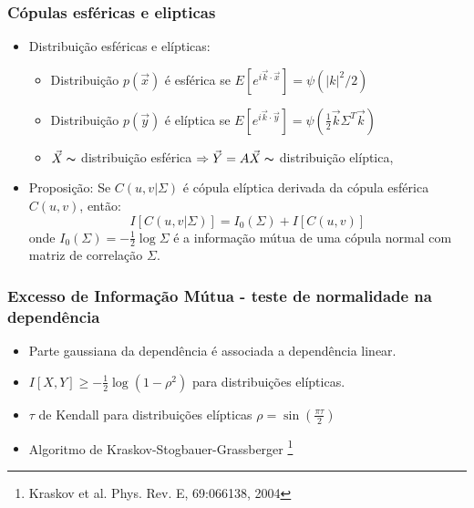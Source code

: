 \documentclass[ignorenonframetext,]{beamer}
\begin{document}
\begin{frame}\frametitle{Cópulas esféricas e elipticas}

\begin{itemize}
\itemsep1pt\parskip0pt
\item
  Distribuição esféricas e elípticas:

  \begin{itemize}
  \itemsep1pt\parskip0pt
  \item
    Distribuição $p(\vec{x})$ é esférica se
    $E\left[ e^{i\vec{k}\cdot\vec{x}}\right] = \psi\left(\vert k\vert ^2/2\right)$
  \item
    Distribuição $p(\vec{y})$ é elíptica se
    $E\left[ e^{i\vec{k}\cdot\vec{y}}\right] = \psi\left(\frac{1}{2}\vec{k}\Sigma^T \vec{k}\right)$
  \item
    $\vec{X} \thicksim$ distribuição esférica
    $\Rightarrow \vec{Y} = A\vec{X} \thicksim$ distribuição elíptica,
  \end{itemize}
\item
  Proposição: Se $C(u,v \vert  \Sigma)$ é cópula elíptica derivada da
  cópula esférica $C(u,v)$, então:
  \[I[C(u,v\vert \Sigma)] = I_{0}(\Sigma) + I[C(u,v)]\] onde
  $I_{0}(\Sigma) = -\frac{1}{2}\log\Sigma$ é a informação mútua de uma
  cópula normal com matriz de correlação $\Sigma$.
\end{itemize}

\end{frame}

\begin{frame}\frametitle{Excesso de Informação Mútua - teste de
normalidade na dependência}

\begin{itemize}
\itemsep1pt\parskip0pt
\item
  Parte gaussiana da dependência é associada a dependência linear.
\item
  $I[X,Y] \ge -\frac{1}{2}\log(1 - \rho^2)$ para distribuições
  elípticas.
\item
  $\tau$ de Kendall para distribuições elípticas
  $\rho = \sin\left(\frac{\pi\tau}{2}\right)$
\item
  Algoritmo de Kraskov-Stogbauer-Grassberger
  \footnote{Kraskov et al. Phys. Rev. E, 69:066138, 2004}
\end{itemize}

\end{frame}
\end{document}

